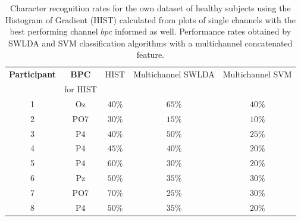 \documentclass[utf8]{frontiersSCNS} %
\begin{document}
\begin{table}[htb]
\caption{Character recognition rates for the own dataset of healthy subjects using the Histogram of Gradient (HIST) calculated from plots of single channels with the best performing channel $bpc$ informed as well.   Performance rates obtained by SWLDA and SVM classification algorithms with a multichannel concatenated feature.}
\centering
\begin{tabular}{c|cc|c|c}
\toprule
\textbf{Participant}	&  \textbf{BPC} 	&  HIST & Multichannel SWLDA & Multichannel SVM  \\
                                    &  for HIST        &           &                                       &   \\
\midrule
1     &     Oz   &     $40\%$  &     $65\%$  &     $40\%$ \\
2     &     PO7   &     $30\%$ &   $15\%$  &     $10\%$ \\
3     &     P4   &     $40\%$ &     $50\%$  &     $25\%$ \\
4     &     P4   &     $45\%$ &     $40\%$  &     $20\%$ \\
5     &     P4   &      $60\%$ &    $30\%$  &     $20\%$ \\
6     &     Pz   &      $50\%$ &    $35\%$  &     $30\%$ \\
7     &     PO7   &      $70\%$ &  $25\%$  &     $30\%$ \\
8     &     P4   &      $50\%$ &    $35\%$  &     $20\%$ \\

\end{tabular}
\label{tab:resultsownswlda}
\end{table}
\end{document}
